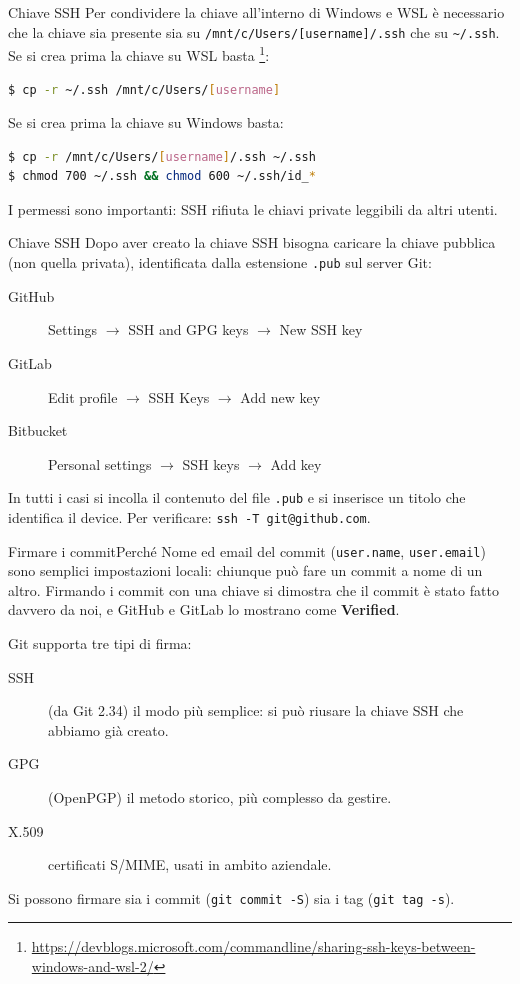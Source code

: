 \documentclass[aspectratio=169,handout,10pt]{beamer}
\begin{document}
\begin{frame}[fragile]{Chiave SSH}
    Per condividere la chiave all'interno di Windows e WSL è necessario che la chiave sia presente sia su \lstinline{/mnt/c/Users/[username]/.ssh} che su \lstinline{~/.ssh}. Se si crea prima la chiave su WSL basta \footnote{\url{https://devblogs.microsoft.com/commandline/sharing-ssh-keys-between-windows-and-wsl-2/}}:
    \begin{lstlisting}[language=bash]
$ cp -r ~/.ssh /mnt/c/Users/[username]\end{lstlisting}
    Se si crea prima la chiave su Windows basta:
    \begin{lstlisting}[language=bash]
$ cp -r /mnt/c/Users/[username]/.ssh ~/.ssh
$ chmod 700 ~/.ssh && chmod 600 ~/.ssh/id_*\end{lstlisting}
    I permessi sono importanti: SSH rifiuta le chiavi private leggibili da altri utenti.
\end{frame}
\begin{frame}[fragile]{Chiave SSH}
    Dopo aver creato la chiave SSH bisogna caricare la chiave pubblica (non quella privata), identificata dalla estensione \lstinline{.pub} sul server Git:
    \begin{description}
        \item[GitHub] Settings \(\rightarrow\) SSH and GPG keys \(\rightarrow\) New SSH key
        \item[GitLab] Edit profile \(\rightarrow\) SSH Keys \(\rightarrow\) Add new key
        \item[Bitbucket] Personal settings \(\rightarrow\) SSH keys \(\rightarrow\) Add key
    \end{description}
    In tutti i casi si incolla il contenuto del file \lstinline{.pub} e si inserisce un titolo che identifica il device. Per verificare: \lstinline{ssh -T git@github.com}.
\end{frame}
\begin{frame}[fragile]{Firmare i commit}{Perché}
    Nome ed email del commit (\lstinline{user.name}, \lstinline{user.email}) sono semplici impostazioni locali: chiunque può fare un commit a nome di un altro. Firmando i commit con una chiave si dimostra che il commit è stato fatto davvero da noi, e GitHub e GitLab lo mostrano come \textbf{Verified}.

    Git supporta tre tipi di firma:
    \begin{description}
        \item[SSH] (da Git 2.34) il modo più semplice: si può riusare la chiave SSH che abbiamo già creato.
        \item[GPG] (OpenPGP) il metodo storico, più complesso da gestire.
        \item[X.509] certificati S/MIME, usati in ambito aziendale.
    \end{description}
    Si possono firmare sia i commit (\lstinline{git commit -S}) sia i tag (\lstinline{git tag -s}).
\end{frame}
\end{document}
